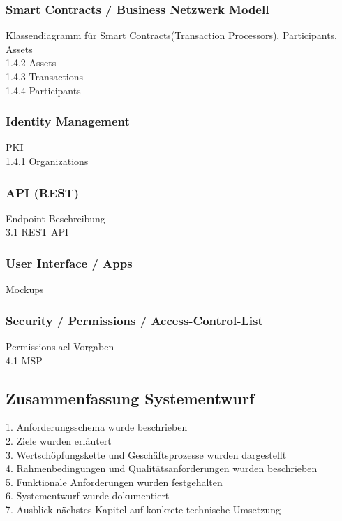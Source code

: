 \subsubsection{Smart Contracts / Business Netzwerk Modell}
Klassendiagramm für Smart Contracts(Transaction Processors), Participants, Assets\\
1.4.2 Assets\\
1.4.3 Transactions\\
1.4.4 Participants

\subsubsection{Identity Management}
PKI\\
1.4.1 Organizations

\subsubsection{API (REST)}
Endpoint Beschreibung\\
3.1 REST API

\subsubsection{User Interface / \DH Apps}
Mockups

\subsubsection{Security / Permissions / Access-Control-List}
Permissions.acl Vorgaben\\
4.1 MSP

\subsection{Zusammenfassung Systementwurf}
1. Anforderungsschema wurde beschrieben\\
2. Ziele wurden erläutert\\
3. Wertschöpfungskette und Geschäftsprozesse wurden dargestellt\\
4. Rahmenbedingungen und Qualitätsanforderungen wurden beschrieben\\
5. Funktionale Anforderungen wurden festgehalten\\
6. Systementwurf wurde dokumentiert\\
7. Ausblick nächstes Kapitel auf konkrete technische Umsetzung

\newpage
